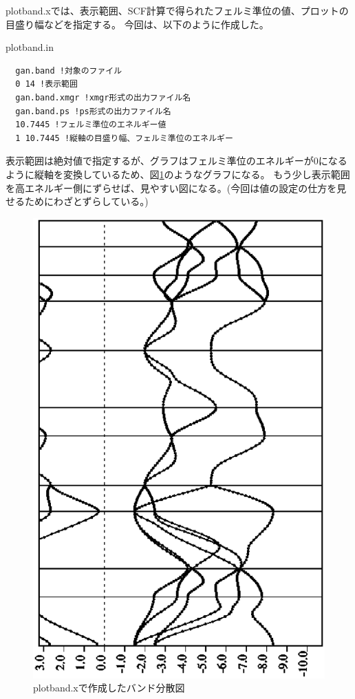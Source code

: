 plotband.xでは、表示範囲、SCF計算で得られたフェルミ準位の値、プロットの目盛り幅などを指定する。
今回は、以下のように作成した。
\begin{example}{plotband.in}
\begin{verbatim}
  gan.band !対象のファイル
  0 14 !表示範囲
  gan.band.xmgr !xmgr形式の出力ファイル名
  gan.band.ps !ps形式の出力ファイル名
  10.7445 !フェルミ準位のエネルギー値
  1 10.7445 !縦軸の目盛り幅、フェルミ準位のエネルギー
\end{verbatim}
\end{example}
表示範囲は絶対値で指定するが、グラフはフェルミ準位のエネルギーが0になるように縦軸を変換しているため、図\ref{fig_plotband}のようなグラフになる。
もう少し表示範囲を高エネルギー側にずらせば、見やすい図になる。(今回は値の設定の仕方を見せるためにわざとずらしている。)

\begin{figure}[bht]
  \centering
  \includegraphics[scale=0.35,bb=0 0 612 792, angle=270]{./chap03/gan.band.eps}
  \caption{plotband.xで作成したバンド分散図}
  \label{fig_plotband}
\end{figure}

